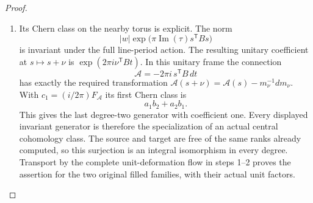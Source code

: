 \begin{proof}
\begin{enumerate}[label=\arabic*.]
\item Its Chern class on the nearby torus is explicit.  The norm
\[
 |w|\exp\!\bigl(\pi\operatorname{Im}(\tau)
                      s^{\mathsf T}Bs\bigr)
\]
is invariant under the full line-period action.  The resulting
unitary coefficient at \(s\mapsto s+\nu\) is
\(\exp(2\pi i\nu^{\mathsf T}Bt)\).  In this unitary frame the
connection
\[
 \mathcal A=-2\pi i\,s^{\mathsf T}B\,dt
\]
has exactly the required transformation
\(\mathcal A(s+\nu)=\mathcal A(s)-m_\nu^{-1}dm_\nu\).
With \(c_1=(i/2\pi)F_{\mathcal A}\) its first Chern class is
\[
                a_1b_2+a_2b_1.
\]
This gives the last degree-two generator with coefficient one.
Every displayed invariant generator is therefore the specialization
of an actual central cohomology class.  The source and target are
free of the same ranks already computed, so this surjection is an
integral isomorphism in every degree.  Transport by the complete
unit-deformation flow in steps 1--2 proves the assertion for the
two original filled families, with their actual unit factors.
\end{enumerate}
\end{proof}

